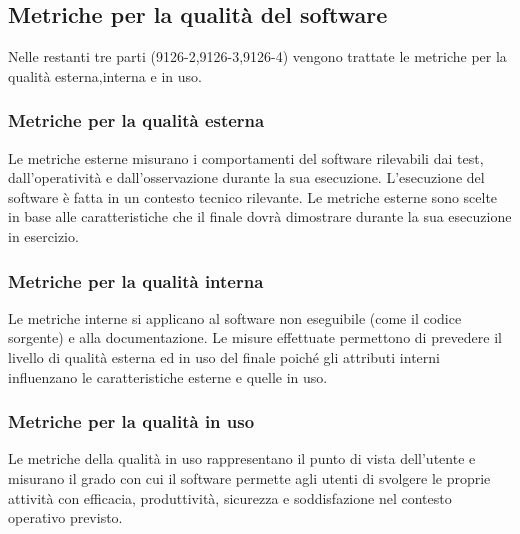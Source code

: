 \documentclass[PianoDiQualifica.tex]{subfiles}
\begin{document}
\subsection{Metriche per la qualità del software}
Nelle restanti tre parti (9126-2,9126-3,9126-4) vengono trattate le metriche per la qualità esterna,interna e in uso.

\subsubsection{Metriche per la qualità esterna}
Le metriche esterne misurano i comportamenti del software rilevabili dai test, dall’operatività e dall’osservazione durante la sua esecuzione.
L’esecuzione del software è fatta in un contesto tecnico rilevante.
Le metriche esterne sono scelte in base alle caratteristiche che il 
finale dovrà dimostrare durante la sua esecuzione in esercizio.

\subsubsection{Metriche per la qualità interna}
Le metriche interne si applicano al software non eseguibile (come il codice sorgente) e alla documentazione. Le misure effettuate permettono di prevedere il livello di qualità esterna ed in uso del  finale poiché gli attributi interni influenzano le caratteristiche esterne e quelle in uso.

\subsubsection{Metriche per la qualità in uso}
Le metriche della qualità in uso rappresentano il punto di vista dell'utente e misurano il grado con cui il software permette agli utenti di svolgere le proprie attività con efficacia, produttività, sicurezza e soddisfazione nel contesto operativo previsto.
\end{document}
